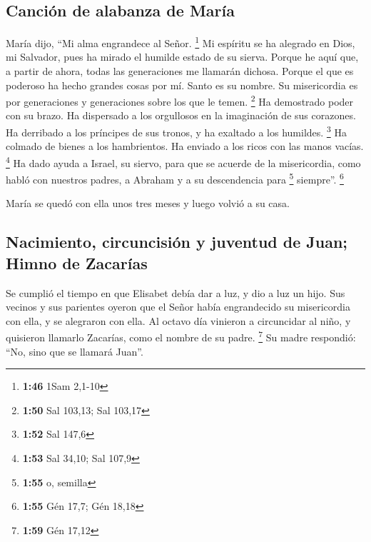 \begin{paracol}{2}
\hypertarget{canciuxf3n-de-alabanza-de-maruxeda}{%
\subsection{Canción de alabanza de
María}\label{canciuxf3n-de-alabanza-de-maruxeda}}

 María dijo, ``Mi alma engrandece al Señor. \footnote{\textbf{1:46}
  1Sam 2,1-10}  Mi espíritu se ha alegrado en Dios, mi
Salvador,  pues ha mirado el humilde estado de su sierva.
Porque he aquí que, a partir de ahora, todas las generaciones me
llamarán dichosa.  Porque el que es poderoso ha hecho
grandes cosas por mí. Santo es su nombre.  Su
misericordia es por generaciones y generaciones sobre los que le temen.
\footnote{\textbf{1:50} Sal 103,13; Sal 103,17}  Ha
demostrado poder con su brazo. Ha dispersado a los orgullosos en la
imaginación de sus corazones.  Ha derribado a los
príncipes de sus tronos, y ha exaltado a los humildes. \footnote{\textbf{1:52}
  Sal 147,6}  Ha colmado de bienes a los hambrientos. Ha
enviado a los ricos con las manos vacías. \footnote{\textbf{1:53} Sal
  34,10; Sal 107,9}  Ha dado ayuda a Israel, su siervo,
para que se acuerde de la misericordia,  como habló con
nuestros padres, a Abraham y a su descendencia para \footnote{\textbf{1:55}
  o, semilla} siempre''. \footnote{\textbf{1:55} Gén 17,7; Gén 18,18}

 María se quedó con ella unos tres meses y luego volvió a
su casa.

\hypertarget{nacimiento-circuncisiuxf3n-y-juventud-de-juan-himno-de-zacaruxedas}{%
\subsection{Nacimiento, circuncisión y juventud de Juan; Himno de
Zacarías}\label{nacimiento-circuncisiuxf3n-y-juventud-de-juan-himno-de-zacaruxedas}}

 Se cumplió el tiempo en que Elisabet debía dar a luz, y
dio a luz un hijo.  Sus vecinos y sus parientes oyeron
que el Señor había engrandecido su misericordia con ella, y se alegraron
con ella.  Al octavo día vinieron a circuncidar al niño,
y quisieron llamarlo Zacarías, como el nombre de su padre. \footnote{\textbf{1:59}
  Gén 17,12}  Su madre respondió: ``No, sino que se
llamará Juan''.


\end{paracol}
